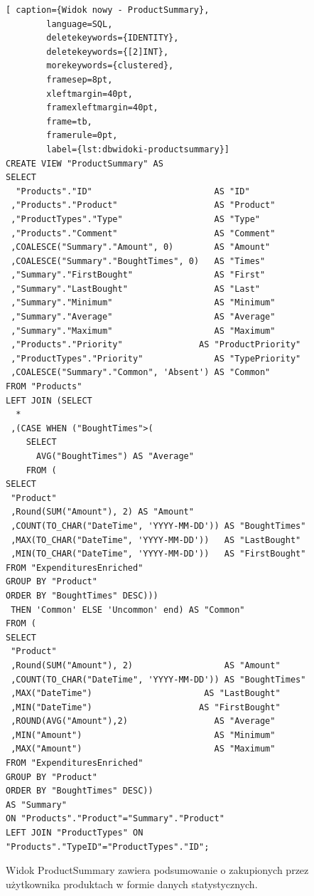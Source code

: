 \documentclass[a4paper,10pt, twoside]{report}
\begin{document}
\begin{large}
\begin{minipage}{\textwidth}
    \begin{lstlisting}[ caption={Widok nowy - ProductSummary},
        language=SQL,
        deletekeywords={IDENTITY},
        deletekeywords={[2]INT},
        morekeywords={clustered},
        framesep=8pt,
        xleftmargin=40pt,
        framexleftmargin=40pt,
        frame=tb,
        framerule=0pt,
        label={lst:dbwidoki-productsummary}]
CREATE VIEW "ProductSummary" AS
SELECT
  "Products"."ID"                        AS "ID"
 ,"Products"."Product"                   AS "Product"
 ,"ProductTypes"."Type"                  AS "Type"
 ,"Products"."Comment"                   AS "Comment"
 ,COALESCE("Summary"."Amount", 0)        AS "Amount"
 ,COALESCE("Summary"."BoughtTimes", 0)   AS "Times"
 ,"Summary"."FirstBought"                AS "First"
 ,"Summary"."LastBought"                 AS "Last"
 ,"Summary"."Minimum"                    AS "Minimum"
 ,"Summary"."Average"                    AS "Average"
 ,"Summary"."Maximum"                    AS "Maximum"
 ,"Products"."Priority"               AS "ProductPriority"
 ,"ProductTypes"."Priority"              AS "TypePriority"
 ,COALESCE("Summary"."Common", 'Absent') AS "Common"
FROM "Products"
LEFT JOIN (SELECT
  *
 ,(CASE WHEN ("BoughtTimes">(
    SELECT
      AVG("BoughtTimes") AS "Average"
    FROM (
SELECT
 "Product"
 ,Round(SUM("Amount"), 2) AS "Amount"
 ,COUNT(TO_CHAR("DateTime", 'YYYY-MM-DD')) AS "BoughtTimes"
 ,MAX(TO_CHAR("DateTime", 'YYYY-MM-DD'))   AS "LastBought"
 ,MIN(TO_CHAR("DateTime", 'YYYY-MM-DD'))   AS "FirstBought"
FROM "ExpendituresEnriched"
GROUP BY "Product"
ORDER BY "BoughtTimes" DESC)))
 THEN 'Common' ELSE 'Uncommon' end) AS "Common"
FROM (
SELECT
 "Product"
 ,Round(SUM("Amount"), 2)                  AS "Amount"
 ,COUNT(TO_CHAR("DateTime", 'YYYY-MM-DD')) AS "BoughtTimes"
 ,MAX("DateTime")                      AS "LastBought"
 ,MIN("DateTime")                     AS "FirstBought"
 ,ROUND(AVG("Amount"),2)                 AS "Average"
 ,MIN("Amount")                          AS "Minimum"
 ,MAX("Amount")                          AS "Maximum"
FROM "ExpendituresEnriched"
GROUP BY "Product"
ORDER BY "BoughtTimes" DESC))
AS "Summary"
ON "Products"."Product"="Summary"."Product"
LEFT JOIN "ProductTypes" ON
"Products"."TypeID"="ProductTypes"."ID";\end{lstlisting}
\end{minipage}

{Widok ProductSummary zawiera podsumowanie o zakupionych przez użytkownika 
produktach w formie danych statystycznych.}


\end{large}
\end{document}
